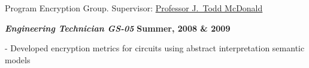 Program Encryption Group.
Supervisor: 
\href{http://www.soc.southalabama.edu/~mcdonald/}
{Professor J.~Todd McDonald}
\vspace{-0.5em}
\begin{outerlist}

\item[] \textbf{\textit{Engineering Technician GS-05}}%
\hfill \textbf{Summer, 2008 \& 2009}

\begin{innerlist}

\item[-] Developed encryption metrics for circuits using abstract interpretation semantic models

\end{innerlist}
\end{outerlist}





\vspace{-0.5em}

